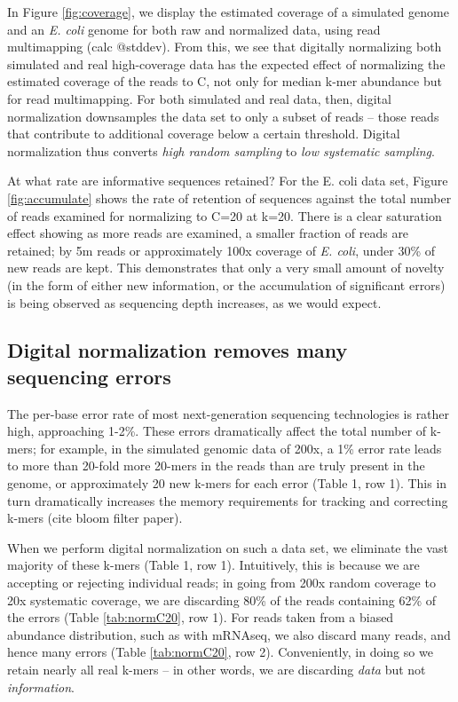 \documentclass[10pt]{article}
\begin{document}
In Figure \ref{fig:coverage}, we display the estimated coverage of a
simulated genome and an {\em E. coli} genome for both raw and
normalized data, using read multimapping (calc @stddev).  From this,
we see that digitally normalizing both simulated and real
high-coverage data has the expected effect of normalizing the
estimated coverage of the reads to C, not only for median k-mer
abundance but for read multimapping.  For both simulated and real
data, then, digital normalization downsamples the data set to only a
subset of reads -- those reads that contribute to additional coverage
below a certain threshold.  Digital normalization thus converts {\em
  high random sampling} to {\em low systematic sampling}.

At what rate are informative sequences retained?  For the E. coli data
set, Figure \ref{fig:accumulate} shows the rate of retention of
sequences against the total number of reads examined for normalizing
to C=20 at k=20.  There is a clear saturation effect showing as more
reads are examined, a smaller fraction of reads are retained; by 5m
reads or approximately 100x coverage of {\em E. coli}, under 30\% of
new reads are kept.  This demonstrates that only a very small amount
of novelty (in the form of either new information, or the accumulation
of significant errors) is being observed as sequencing depth increases,
as we would expect.


\subsection*{Digital normalization removes many sequencing errors}

The per-base error rate of most next-generation sequencing technologies
is rather high, approaching 1-2\%.  
These
errors dramatically affect the total number of k-mers; for example, in the
simulated genomic data of 200x, a 1\% error rate leads to more than
20-fold more 20-mers in the reads than are truly present in the genome,
or approximately 20 new k-mers for each error (Table 1, row 1).
This in turn dramatically increases the memory requirements for
tracking and correcting k-mers (cite bloom filter paper).


When we perform digital normalization on such a data set, we eliminate
the vast majority of these k-mers (Table 1, row 1).  Intuitively, this is
because we are accepting or rejecting individual reads; in going from
200x random coverage to 20x systematic coverage, we are discarding
80\% of the reads containing 62\% of the errors (Table \ref{tab:normC20}, row 1).
For reads taken from a biased abundance distribution, such as with
mRNAseq, we also discard many reads, and hence many errors (Table \ref{tab:normC20}, row 2).
Conveniently, in doing so we retain nearly all real k-mers -- in other words,
we are discarding {\em data} but not {\em information}.
\end{document}
